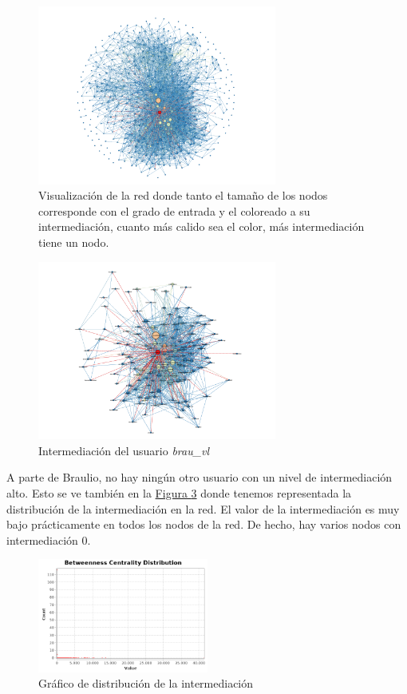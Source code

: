 \documentclass[10pt,a4paper,spanish]{article}
\numberwithin{equation}{section} %
\numberwithin{figure}{section} %
\numberwithin{table}{section} %
\begin{document}
\begin{figure}[!h]
    \centering
    \includegraphics[width=0.7\textwidth]{medidas_locales/intermediacion}
    \caption{Visualización de la red donde tanto el tamaño de los nodos corresponde con el grado de entrada y el coloreado a su intermediación, cuanto más calido sea el color, más intermediación tiene un nodo.}
    \label{intermediacion}
\end{figure}

\begin{figure}[!h]
    \centering
    \includegraphics[width=0.7\textwidth]{medidas_locales/intermediacionbrau}
    \caption{Intermediación del usuario \textit{brau\_vl}}
    \label{intermediacionbrau}
\end{figure}

A parte de Braulio, no hay ningún otro usuario con un nivel de intermediación alto. Esto se ve también en la \hyperref[bet]{Figura \ref*{bet}} donde tenemos representada la distribución de la intermediación en la red. El valor de la intermediación es muy bajo prácticamente en todos los nodos de la red. De hecho, hay varios nodos con intermediación 0.

\begin{figure}[!h]
    \centering
    \includegraphics[width=0.5\textwidth]{distance-report/Betweenness-Centrality-Distribution}
    \caption{Gráfico de distribución de la intermediación}
    \label{bet}
\end{figure}
\end{document}
